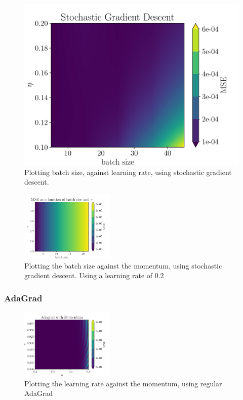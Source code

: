 \documentclass[aps,pra,english,notitlepage,reprint,nofootinbib]{revtex4-1}  %
\begin{document}
\begin{figure}[ht!]
    \centering
    \includegraphics[width = .4\textwidth]{../figs/SGD_batch_eta_.pdf}
    \caption{Plotting batch size, against learning rate, using stochastic gradient descent.}
    \label{fig: SGD_batch_eta}
\end{figure}

\begin{figure}[ht!]
    \centering
    \includegraphics[width = 0.4\textwidth]{../figs/SGD_batch_gamma.pdf}
    \caption{Plotting the batch size against the momentum, using stochastic gradient descent. Using a learning rate of $0.2$}
    \label{fig: SGD_batch_gamma}
\end{figure}

\subsubsection{AdaGrad}
\begin{figure}[ht!]
    \centering
    \includegraphics[width = 0.4\textwidth]{../figs/AdagradMomentum_eta_gamma.pdf}
    \caption{Plotting the learning rate against the momentum, using regular AdaGrad}
    \label{fig: AdagradMomentum_eta_gamma}
\end{figure}
\end{document}
